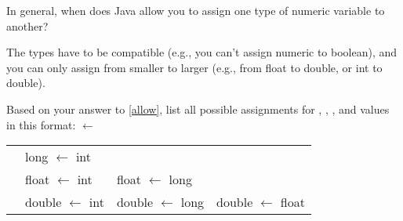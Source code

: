\Q \label{allow} In general, when does Java allow you to assign one type of numeric variable to another?

\begin{answer}
The types have to be compatible (e.g., you can't assign numeric to boolean), and you can only assign from smaller to larger (e.g., from float to double, or int to double).
\end{answer}


\Q Based on your answer to \ref{allow}, list all possible assignments for , , , and  values in this format:  $\gets$ 

\begin{answer}[5em]
\setlength{\tabcolsep}{12pt}
\begin{tabular}{llll}
&  long   $\gets$ int  &                       &                        \\
&  float  $\gets$ int  &  float  $\gets$ long  &                        \\
&  double $\gets$ int  &  double $\gets$ long  &  double $\gets$ float  \\
\end{tabular}
\end{answer}
